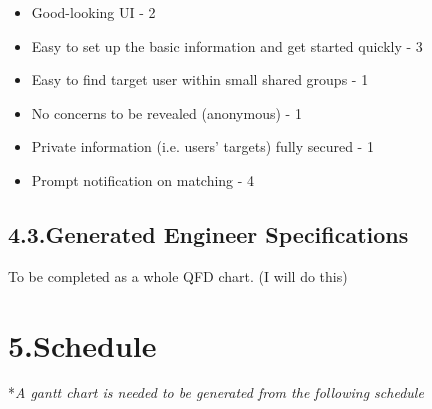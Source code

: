 \documentclass{article}
\begin{document}
\begin{itemize}[noitemsep,topsep=\mdcompacttopsep]%

\item{}Good-looking UI - 2%

\item{}Easy to set up the basic information and get started quickly - 3%

\item{}Easy to find target user within small shared groups - 1%

\item{}No concerns to be revealed (anonymous) - 1%

\item{}Private information (i.e. users' targets) fully secured - 1%

\item{}Prompt notification on matching - 4%
\end{itemize}%

\subsection{4.3.\hspace*{0.5em}Generated Engineer Specifications}\label{sec-generated-engineer-specifications}%

\noindent{}To be completed as a whole QFD chart. (I will do this)%

\section{5.\hspace*{0.5em}Schedule}\label{sec-schedule}%

\noindent{}*\emph{A gantt chart is needed to be generated from the following schedule}%
\end{document}
